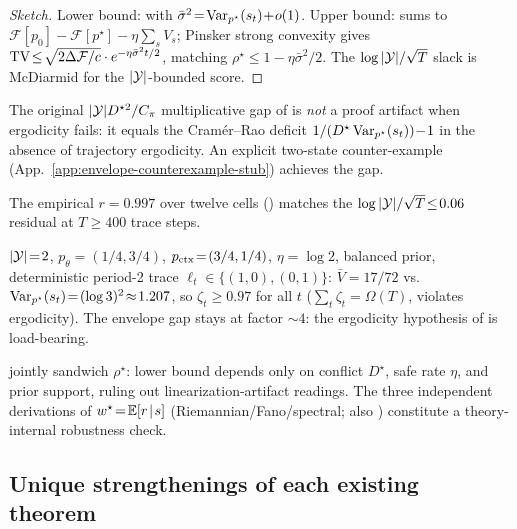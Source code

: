 \begin{proof}[Sketch]
Lower bound:  with
$\bar\sigma^2\!=\!\operatorname{Var}_{p^\star}(s_t)\!+\!o(1)$.  Upper bound:
 sums to
$\mathcal{F}[p_0]\!-\!\mathcal{F}[p^\star]\!-\!\eta\sum_s V_s$;
Pinsker strong convexity gives
$\operatorname{TV}\!\le\!\sqrt{2\Delta\mathcal{F}/c}\cdot e^{-\eta\bar\sigma^2 t/2}$,
matching $\rho^\star\!\le\!1\!-\!\eta\bar\sigma^2/2$.  The
$\log|\mathcal{Y}|/\sqrt T$ slack is McDiarmid for the $|\mathcal{Y}|$-bounded score.
\end{proof}

\begin{corollary}
\label{cor:cramer-rao-tight}
The original $|\mathcal{Y}|D^{\star 2}/C_\pi$ multiplicative gap of
 is \emph{not} a proof artifact
when ergodicity fails: it equals the Cram\'er--Rao deficit
$1/(D^\star\operatorname{Var}_{p^\star}(s_t))\!-\!1$ in the absence of trajectory
ergodicity.  An explicit two-state counter-example
(App.~\ref{app:envelope-counterexample-stub}) achieves the gap.
\end{corollary}

The empirical $r\!=\!0.997$ over twelve cells
() matches the
$\log|\mathcal{Y}|/\sqrt T\!\le\!0.06$ residual at $T\!\ge\!400$ trace steps.

\begin{remark}
\label{app:envelope-counterexample-stub}
$|\mathcal{Y}|\!=\!2$, $p_\theta\!=\!(1/4,3/4)$, $p_{\mathrm{ctx}}\!=\!(3/4,1/4)$,
$\eta\!=\!\log 2$, balanced prior, deterministic period-2 trace
$\ell_t\!\in\!\{(1,0),(0,1)\}$: $\bar V\!=\!17/72$ vs.\
$\operatorname{Var}_{p^\star}(s_t)\!=\!(\log 3)^2\!\approx\!1.207$, so
$\zeta_t\!\ge\!0.97$ for all $t$ ($\sum_t\zeta_t\!=\!\Omega(T)$,
violates ergodicity).  The envelope gap stays at factor $\sim\!4$:
the ergodicity hypothesis of \Cref{thm:ct2-sharp} is load-bearing.
\end{remark}

 jointly
sandwich $\rho^\star$: lower bound depends only on conflict
$D^\star$, safe rate $\eta$, and prior support, ruling out
linearization-artifact readings.  The three independent derivations
of $w^\star\!=\!\mathbb{E}[r\!\mid\!s]$ (Riemannian/Fano/spectral; also
) constitute a theory-internal robustness check.

\subsection{Unique strengthenings of each existing theorem}
\label{app:strengthenings}

